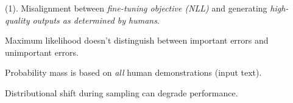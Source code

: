 \documentclass[11pt]{article}
\begin{document}



 (1). Misalignment between \textit{fine-tuning objective (NLL)} and generating \textit{high-quality outputs as determined by humans}. 
\begin{compactitem}
	\item Maximum likelihood doesn't distinguish between important errors and unimportant errors. 
	\item Probability mass is based on \textit{all} human demonstrations (input text). 
	\item Distributional shift during sampling can degrade performance. 
\end{compactitem}












\label{Computer Vision}




\end{document}
